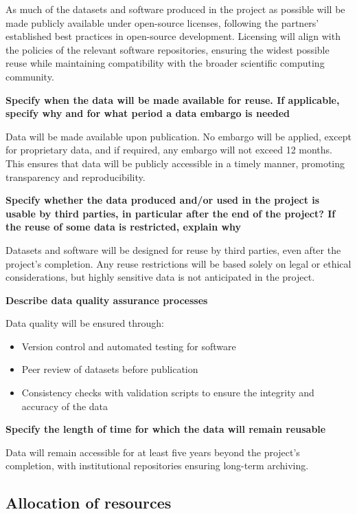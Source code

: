 \documentclass[a4paper,12pt]{article}
\begin{document}
As much of the datasets and software produced in the project as possible will be made publicly available under open-source licenses, following the partners' established best practices in open-source development. Licensing will align with the policies of the relevant software repositories, ensuring the widest possible reuse while maintaining compatibility with the broader scientific computing community. 

\noindent \textbf{Specify when the data will be made available for reuse. If applicable, specify why and for what period a data embargo is needed}

Data will be made available upon publication. No embargo will be applied, except for proprietary data, and if required, any embargo will not exceed 12 months. This ensures that data will be publicly accessible in a timely manner, promoting transparency and reproducibility.

\noindent \textbf{Specify whether the data produced and/or used in the project is usable by third parties, in particular after the end of the project? If the reuse of some data is restricted, explain why}

Datasets and software will be designed for reuse by third parties, even after the project's completion. Any reuse restrictions will be based solely on legal or ethical considerations, but highly sensitive data is not anticipated in the project.

\noindent \textbf{Describe data quality assurance processes}

Data quality will be ensured through:
\begin{itemize}
\item Version control and automated testing for software
\item Peer review of datasets before publication
\item Consistency checks with validation scripts to ensure the integrity and accuracy of the data
\end{itemize}

\noindent\textbf{Specify the length of time for which the data will remain reusable} 

Data will remain accessible for at least five years beyond the project's completion, with institutional repositories ensuring long-term archiving. 

\subsection{Allocation of resources}
\end{document}
